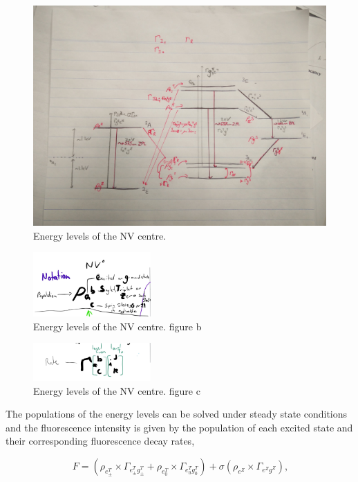 \documentclass[prl]{revtex4}
\begin{document}
\begin{figure}[H]
  \centering
  \includegraphics[width=1\textwidth]{NV.jpg} 
 \caption{Energy levels of the NV centre.} \label{FigEnergyLevelsNV}
\end{figure}

\begin{figure}[H]
  \centering
  \includegraphics[width=0.4\textwidth]{NVb.jpg} 
 \caption{Energy levels of the NV centre. figure b} \label{NVb}
\end{figure}

\begin{figure}[H]
  \centering
  \includegraphics[width=0.4\textwidth]{NVc.jpg} 
 \caption{Energy levels of the NV centre. figure c} \label{NVc}
\end{figure}

The populations of the energy levels can be solved under steady state conditions and the fluorescence intensity is given by the population of each excited state and their corresponding fluorescence decay rates,

\begin{equation}
\SI{}{F} = \left(\rho_{e^{T}_\pm}\times\Gamma_{e^T_{\pm}g^T_{\pm}} +\rho_{e^{T}_0}\times\Gamma_{e^T_{0}g^T_{0}}\right)+\sigma\left(\rho_{e^Z}\times\Gamma_{e^Zg^Z}\right),
\label{EqnFluoro}
\end{equation}
\end{document}

